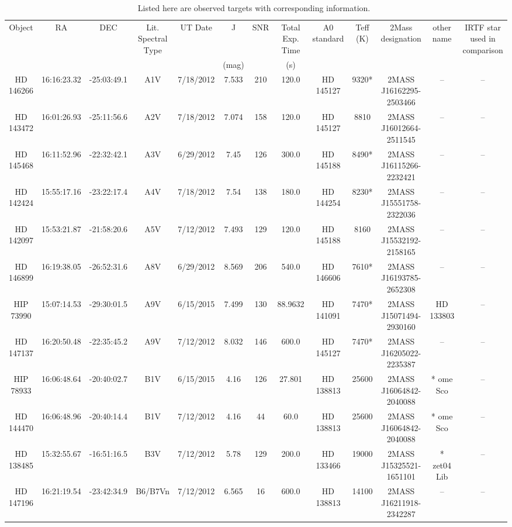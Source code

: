 \begin{table}
\begin{center}
\caption{Listed here are observed targets with corresponding information.~\label{tab:maintab}}
\begin{tabular}{c|c|c|c|c|c|c|c|c|c|c|c|c}
Object & RA & DEC & Lit. Spectral Type & UT Date & J & SNR & Total Exp. Time & A0 standard & Teff (K) & 2Mass designation & other name & IRTF star used in comparison \\
 &  &  &  &  & (mag) &  & (s) &  &  &  &  &  \\
HD 146266 & 16:16:23.32 & -25:03:49.1 & A1V & 7/18/2012 & 7.533 & 210 & 120.0 & HD 145127 & 9320* & 2MASS J16162295-2503466 & -- & -- \\
HD 143472 & 16:01:26.93 & -25:11:56.6 & A2V & 7/18/2012 & 7.074 & 158 & 120.0 & HD 145127 & 8810 & 2MASS J16012664-2511545 & -- & -- \\
HD 145468 & 16:11:52.96 & -22:32:42.1 & A3V & 6/29/2012 & 7.45 & 126 & 300.0 & HD 145188 & 8490* & 2MASS J16115266-2232421 & -- & -- \\
HD 142424 & 15:55:17.16 & -23:22:17.4 & A4V & 7/18/2012 & 7.54 & 138 & 180.0 & HD 144254 & 8230* & 2MASS J15551758-2322036 & -- & -- \\
HD 142097 & 15:53:21.87 & -21:58:20.6 & A5V & 7/12/2012 & 7.493 & 129 & 120.0 & HD 145188 & 8160 & 2MASS J15532192-2158165 & -- & -- \\
HD 146899 & 16:19:38.05 & -26:52:31.6 & A8V & 6/29/2012 & 8.569 & 206 & 540.0 & HD 146606 & 7610* & 2MASS J16193785-2652308 & -- & -- \\
HIP 73990 & 15:07:14.53 & -29:30:01.5 & A9V & 6/15/2015 & 7.499 & 130 & 88.9632 & HD 141091 & 7470* & 2MASS J15071494-2930160 & HD 133803 & -- \\
HD 147137 & 16:20:50.48 & -22:35:45.2 & A9V & 7/12/2012 & 8.032 & 146 & 600.0 & HD 145127 & 7470* & 2MASS J16205022-2235387 & -- & -- \\
HIP 78933 & 16:06:48.64 & -20:40:02.7 & B1V & 6/15/2015 & 4.16 & 126 & 27.801 & HD 138813 & 25600 & 2MASS J16064842-2040088 & * ome Sco & -- \\
HD 144470 & 16:06:48.96 & -20:40:14.4 & B1V & 7/12/2012 & 4.16 & 44 & 60.0 & HD 138813 & 25600 & 2MASS J16064842-2040088 & * ome Sco & -- \\
HD 138485 & 15:32:55.67 & -16:51:16.5 & B3V & 7/12/2012 & 5.78 & 129 & 200.0 & HD 133466 & 19000 & 2MASS J15325521-1651101 & * zet04 Lib & -- \\
HD 147196 & 16:21:19.54 & -23:42:34.9 & B6/B7Vn & 7/12/2012 & 6.565 & 16 & 600.0 & HD 138813 & 14100 & 2MASS J16211918-2342287 & -- & -- \\

\end{tabular}
\end{center}
\end{table}
